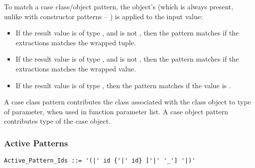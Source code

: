To match a case class/object pattern, the object's  (which is always present, unlike with constructor patterns -- ) is applied to the input value:
\begin{itemize}
  \item If the result value is of type , and is not , then the pattern matches if the extractions matches the wrapped tuple. 
  \item If the result value is of type , and is not , then the pattern matches if the extractions matches the wrapped value. 
  \item If the result value is of type , then the pattern matches if the value is . 
\end{itemize} 

A case class pattern contributes the class associated with the class object to type of parameter, when used in function parameter list. A case object pattern contributes type of the case object. 





\subsubsection{Active Patterns}
\label{sec:active-patterns}

\syntax\begin{lstlisting}
Active_Pattern_Ids ::= '(|' id {'|' id} ['|' '_'] '|)'
\end{lstlisting}

